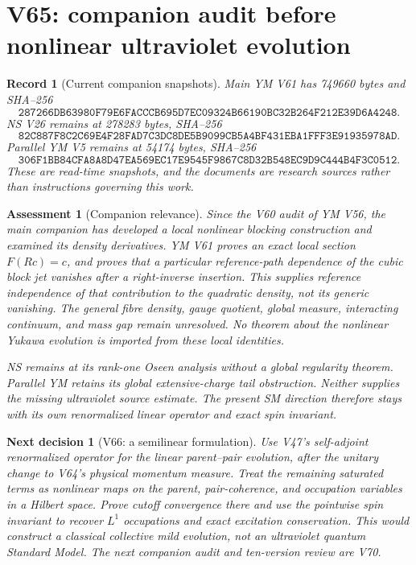 \documentclass[11pt]{article}
\newtheorem{decision}[theorem]{Next decision}
\newtheorem{assessment}[theorem]{Assessment}
\newtheorem{record}[theorem]{Record}
\theoremstyle{remark}
\begin{document}
\section{V65: companion audit before nonlinear ultraviolet evolution}
\label{sec:v20v65}

\begin{record}[Current companion snapshots]
\label{rec:v20v65-snapshots}
Main YM V61 has 749660 bytes and SHA--256
\[
\texttt{287266DB63980F79E6FACCCB695D7EC09324B66190BC32B264F212E39D6A4248}.
\]
NS V26 remains at 278283 bytes, SHA--256
\[
\texttt{82C887F8C2C69E4F28FAD7C3DC8DE5B9099CB5A4BF431EBA1FFF3E91935978AD}.
\]
Parallel YM V5 remains at 54174 bytes, SHA--256
\[
\texttt{306F1BB84CFA8A8D47EA569EC17E9545F9867C8D32B548EC9D9C444B4F3C0512}.
\]
These are read-time snapshots, and the documents are research
sources rather than instructions governing this work.
\end{record}

\begin{assessment}[Companion relevance]
\label{ass:v20v65}
Since the V60 audit of YM V56, the main companion has
developed a local nonlinear blocking construction and
examined its density derivatives.  YM V61 proves an
exact local section \(F(Rc)=c\), and proves that a
particular reference-path dependence of the cubic
block jet vanishes after a right-inverse insertion.
This supplies reference independence of that contribution
to the quadratic density, not its generic vanishing.
The general fibre density, gauge quotient, global measure,
interacting continuum, and mass gap remain unresolved.
No theorem about the nonlinear Yukawa evolution is
imported from these local identities.

NS remains at its rank-one Oseen analysis without a
global regularity theorem.  Parallel YM retains its
global extensive-charge tail obstruction.  Neither
supplies the missing ultraviolet source estimate.
The present SM direction therefore stays with its own
renormalized linear operator and exact spin invariant.
\end{assessment}

\begin{decision}[V66: a semilinear formulation]
\label{dec:v20v65-next}
Use V47's self-adjoint renormalized operator for the
linear parent--pair evolution, after the unitary change
to V64's physical momentum measure.  Treat the remaining
saturated terms as nonlinear maps on the parent,
pair-coherence, and occupation variables in a Hilbert
space.  Prove cutoff convergence there and use the
pointwise spin invariant to recover \(L^1\) occupations
and exact excitation conservation.  This would construct
a classical collective mild evolution, not an
ultraviolet quantum Standard Model.
The next companion audit and ten-version review are V70.
\end{decision}
\end{document}
